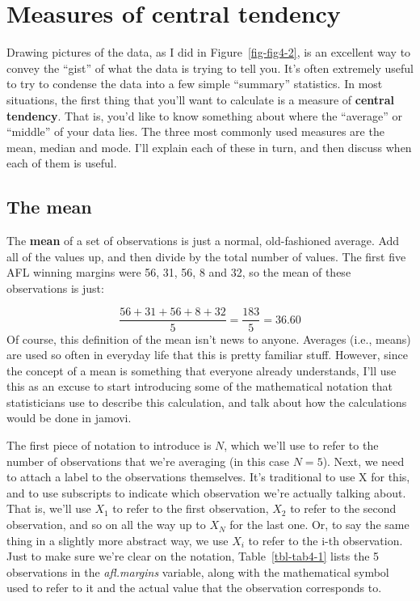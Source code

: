 \documentclass[
  a4paper,
]{book}
\begin{document}
\hypertarget{measures-of-central-tendency}{%
\section{Measures of central
tendency}\label{measures-of-central-tendency}}

Drawing pictures of the data, as I did in Figure~\ref{fig-fig4-2}, is an
excellent way to convey the ``gist'' of what the data is trying to tell
you. It's often extremely useful to try to condense the data into a few
simple ``summary'' statistics. In most situations, the first thing that
you'll want to calculate is a measure of \textbf{central tendency}. That
is, you'd like to know something about where the ``average'' or
``middle'' of your data lies. The three most commonly used measures are
the mean, median and mode. I'll explain each of these in turn, and then
discuss when each of them is useful.

\hypertarget{the-mean}{%
\subsection{The mean}\label{the-mean}}

The \textbf{mean} of a set of observations is just a normal,
old-fashioned average. Add all of the values up, and then divide by the
total number of values. The first five AFL winning margins were 56, 31,
56, 8 and 32, so the mean of these observations is just:

\[
\frac{56 + 31 + 56 + 8 + 32}{5} = \frac{183}{5} = 36.60
\] Of course, this definition of the mean isn't news to anyone. Averages
(i.e., means) are used so often in everyday life that this is pretty
familiar stuff. However, since the concept of a mean is something that
everyone already understands, I'll use this as an excuse to start
introducing some of the mathematical notation that statisticians use to
describe this calculation, and talk about how the calculations would be
done in jamovi.

The first piece of notation to introduce is \(N\), which we'll use to
refer to the number of observations that we're averaging (in this case
\(N = 5\)). Next, we need to attach a label to the observations
themselves. It's traditional to use X for this, and to use subscripts to
indicate which observation we're actually talking about. That is, we'll
use \(X_1\) to refer to the first observation, \(X_2\) to refer to the
second observation, and so on all the way up to \(X_N\) for the last
one. Or, to say the same thing in a slightly more abstract way, we use
\(X_i\) to refer to the i-th observation. Just to make sure we're clear
on the notation, Table~\ref{tbl-tab4-1} lists the 5 observations in the
\emph{afl.margins} variable, along with the mathematical symbol used to
refer to it and the actual value that the observation corresponds to.
\end{document}
